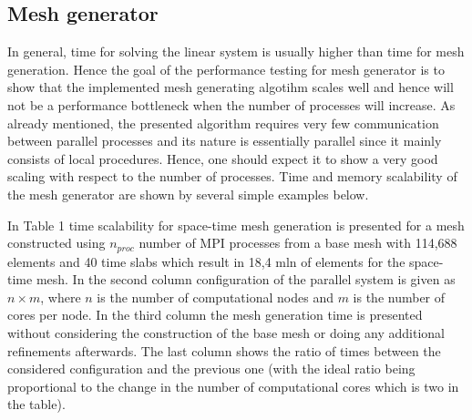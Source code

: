 \documentclass[12pt]{article}
\begin{document}
\subsection{Mesh generator}
In general, time for solving the linear system is usually higher than time for mesh generation. Hence the goal of the performance testing for mesh generator is to show that the implemented mesh generating algotihm scales well and hence will not be a performance bottleneck when the number of processes will increase. As already mentioned, the presented algorithm requires very few communication between parallel processes and its nature is essentially parallel since it mainly consists of local procedures. Hence, one should expect it to show a very good scaling with respect to the number of processes. Time and memory scalability of the mesh generator are shown by several simple examples below.

In Table 1  time scalability for space-time mesh generation is presented for a mesh constructed using $n_{proc}$ number of MPI processes from a base mesh with 114,688 elements and 40 time slabs which result in 18,4 mln of elements for the space-time mesh. In the second column  configuration of the parallel system is given as $n \times m$, where $n$ is the number of computational nodes and $m$ is the number of cores per node. In the third column the mesh generation time is presented without considering the construction of the base mesh or doing any additional refinements afterwards. The last column shows the ratio of times between the considered configuration and the previous one (with the ideal ratio being proportional to the change in the number of computational cores which is two in the table).


\end{document}
